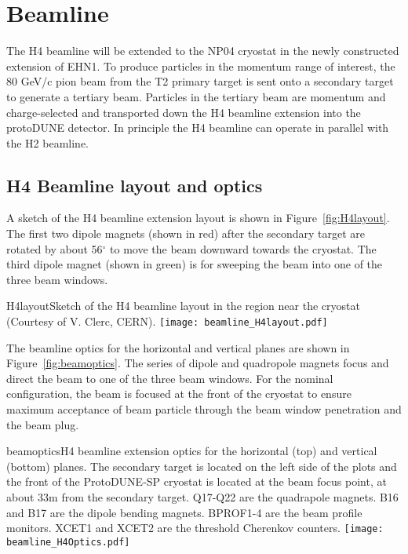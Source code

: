 \section{Beamline}
\label{sec:h4beamline}

The H4 beamline will be extended to the NP04 cryostat in the newly constructed extension of EHN1. To produce particles in the momentum range of interest, the 80 GeV/c pion beam from the T2 primary target is sent onto a secondary target to generate a tertiary beam. Particles in the tertiary beam are momentum and charge-selected and transported down the H4 beamline extension into the protoDUNE detector. In principle the H4 beamline can operate in parallel with the H2 beamline. %

\subsection{H4 Beamline layout and optics}

A sketch of the H4 beamline extension layout is shown in Figure~\ref{fig:H4layout}. The first two dipole magnets (shown in red) after the secondary target are rotated by about 56$^\circ$ to move the beam downward towards the cryostat. The third dipole magnet (shown in green) is for sweeping the beam into one of the three beam windows.
\begin{cdrfigure}{H4layout}{Sketch of the H4 beamline layout in the region near the cryostat (Courtesy of V. Clerc, CERN).}
  \texttt{[image: beamline\_H4layout.pdf]}
\end{cdrfigure}


The beamline optics for the horizontal and vertical planes are shown in Figure~\ref{fig:beamoptics}. The series of dipole and quadropole magnets focus and direct the beam to one of the three beam windows. For the nominal configuration, the beam is focused at the front of the cryostat to ensure maximum acceptance of beam particle through the beam window penetration and the beam plug.

\begin{cdrfigure}{beamoptics}{H4 beamline extension optics for the horizontal (top) and vertical (bottom) planes. The secondary target is located on the left side of the plots and the front of the ProtoDUNE-SP cryostat is located at the beam focus point, at about 33m from the secondary target. Q17-Q22 are the quadrapole magnets. B16 and B17 are the dipole bending magnets. BPROF1-4 are the beam profile monitors. XCET1 and XCET2 are the threshold Cherenkov counters. }
  \texttt{[image: beamline\_H4Optics.pdf]}
\end{cdrfigure}

